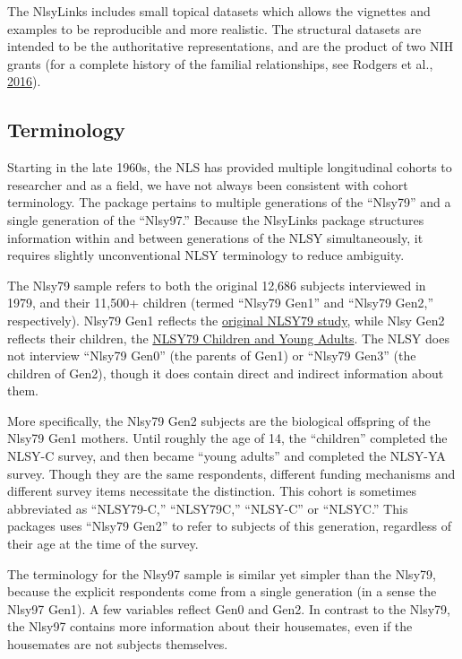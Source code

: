 \documentclass[smallextended]{svjour3}       %
\begin{document}
The NlsyLinks includes small topical datasets which allows the vignettes
and examples to be reproducible and more realistic. The structural
datasets are intended to be the authoritative representations, and are
the product of two NIH grants (for a complete history of the familial
relationships, see Rodgers et al.,
\href{https://link.springer.com/article/10.1007\%2Fs10519-016-9785-3}{2016}).

\hypertarget{terminology}{%
\subsection{Terminology}\label{terminology}}

Starting in the late 1960s, the NLS has provided multiple longitudinal
cohorts to researcher and as a field, we have not always been consistent
with cohort terminology. The package pertains to multiple generations of
the ``Nlsy79'' and a single generation of the ``Nlsy97.'' Because the
NlsyLinks package structures information within and between generations
of the NLSY simultaneously, it requires slightly unconventional NLSY
terminology to reduce ambiguity.

The Nlsy79 sample refers to both the original 12,686 subjects
interviewed in 1979, and their 11,500+ children (termed ``Nlsy79 Gen1''
and ``Nlsy79 Gen2,'' respectively). Nlsy79 Gen1 reflects the
\href{https://www.nlsinfo.org/content/cohorts/nlsy79}{original NLSY79
study}, while Nlsy Gen2 reflects their children, the
\href{https://www.nlsinfo.org/content/cohorts/nlsy79-children}{NLSY79
Children and Young Adults}. The NLSY does not interview ``Nlsy79 Gen0''
(the parents of Gen1) or ``Nlsy79 Gen3'' (the children of Gen2), though
it does contain direct and indirect information about them.

More specifically, the Nlsy79 Gen2 subjects are the biological offspring
of the Nlsy79 Gen1 mothers. Until roughly the age of 14, the
``children'' completed the NLSY-C survey, and then became ``young
adults'' and completed the NLSY-YA survey. Though they are the same
respondents, different funding mechanisms and different survey items
necessitate the distinction. This cohort is sometimes abbreviated as
``NLSY79-C,'' ``NLSY79C,'' ``NLSY-C'' or ``NLSYC.'' This packages uses
``Nlsy79 Gen2'' to refer to subjects of this generation, regardless of
their age at the time of the survey.

The terminology for the Nlsy97 sample is similar yet simpler than the
Nlsy79, because the explicit respondents come from a single generation
(in a sense the Nlsy97 Gen1). A few variables reflect Gen0 and Gen2. In
contrast to the Nlsy79, the Nlsy97 contains more information about their
housemates, even if the housemates are not subjects themselves.
\end{document}
